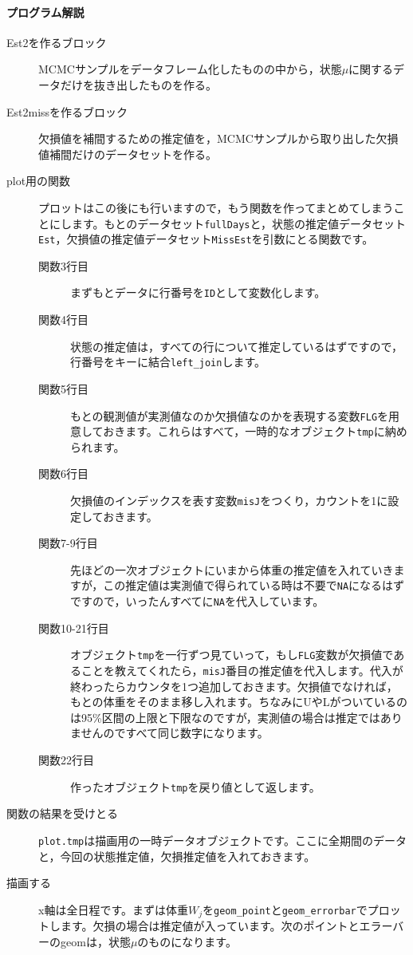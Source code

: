 \documentclass{ltjsbook}
\begin{document}
\paragraph{プログラム解説}
\begin{description}
	\item[Est2を作るブロック] MCMCサンプルをデータフレーム化したものの中から，状態$\mu$に関するデータだけを抜き出したものを作る。
	\item[Est2missを作るブロック] 欠損値を補間するための推定値を，MCMCサンプルから取り出した欠損値補間だけのデータセットを作る。
	\item[plot用の関数] プロットはこの後にも行いますので，もう関数を作ってまとめてしまうことにします。もとのデータセット\verb|fullDays|と，状態の推定値データセット\verb|Est|，欠損値の推定値データセット\verb|MissEst|を引数にとる関数です。
	      \begin{description}
		      \item[関数3行目] まずもとデータに行番号を\verb|ID|として変数化します。
		      \item[関数4行目] 状態の推定値は，すべての行について推定しているはずですので，行番号をキーに結合\verb|left_join|します。
		      \item[関数5行目] もとの観測値が実測値なのか欠損値なのかを表現する変数\verb|FLG|を用意しておきます。これらはすべて，一時的なオブジェクト\verb|tmp|に納められます。
		      \item[関数6行目] 欠損値のインデックスを表す変数\verb|misJ|をつくり，カウントを1に設定しておきます。
		      \item[関数7-9行目] 先ほどの一次オブジェクトにいまから体重の推定値を入れていきますが，この推定値は実測値で得られている時は不要で\verb|NA|になるはずですので，いったんすべてに\verb|NA|を代入しています。
		      \item[関数10-21行目] オブジェクト\verb|tmp|を一行ずつ見ていって，もし\verb|FLG|変数が欠損値であることを教えてくれたら，\verb|misJ|番目の推定値を代入します。代入が終わったらカウンタを1つ追加しておきます。欠損値でなければ，もとの体重をそのまま移し入れます。ちなみにUやLがついているのは95\%区間の上限と下限なのですが，実測値の場合は推定ではありませんのですべて同じ数字になります。
		      \item[関数22行目] 作ったオブジェクト\verb|tmp|を戻り値として返します。
	      \end{description}
	\item[関数の結果を受けとる] \verb|plot.tmp|は描画用の一時データオブジェクトです。ここに全期間のデータと，今回の状態推定値，欠損推定値を入れておきます。
	\item[描画する] x軸は全日程です。まずは体重$W_j$を\verb|geom_point|と\verb|geom_errorbar|でプロットします。欠損の場合は推定値が入っています。次のポイントとエラーバーのgeomは，状態$\mu$のものになります。
\end{description}
\end{document}
